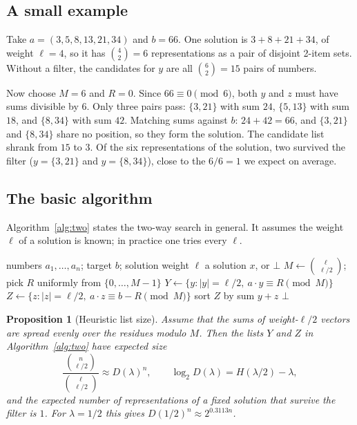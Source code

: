 \documentclass[conference]{IEEEtran}
\newtheorem{proposition}{Proposition}
\begin{document}
\subsection{A small example}
Take $a=(3,5,8,13,21,34)$ and $b=66$. One solution is $3+8+21+34$, of weight
$\ell=4$, so it has $\binom42=6$ representations as a pair of disjoint 2-item
sets. Without a filter, the candidates for $y$ are all $\binom62=15$ pairs of
numbers.

Now choose $M=6$ and $R=0$. Since $66\equiv0\pmod6$, both $y$ and $z$ must have
sums divisible by $6$. Only three pairs pass: $\{3,21\}$ with sum $24$,
$\{5,13\}$ with sum $18$, and $\{8,34\}$ with sum $42$. Matching sums against
$b$: $24+42=66$, and $\{3,21\}$ and $\{8,34\}$ share no position, so they form
the solution. The candidate list shrank from $15$ to $3$. Of the six
representations of the solution, two survived the filter ($y=\{3,21\}$ and
$y=\{8,34\}$), close to the $6/6=1$ we expect on average.

\subsection{The basic algorithm}
Algorithm~\ref{alg:two} states the two-way search in general. It assumes the
weight $\ell$ of a solution is known; in practice one tries every $\ell$.

\begin{algorithm}[t]
\caption{Two-way representation search}
\label{alg:two}
\begin{algorithmic}[1]
\Require numbers $a_1,\dots,a_n$; target $b$; solution weight $\ell$
\Ensure a solution $x$, or $\bot$
\State $M\gets\binom{\ell}{\ell/2}$; pick $R$ uniformly from $\{0,\dots,M-1\}$
\State $Y\gets\{y: |y|=\ell/2,\ a\cdot y\equiv R \pmod M\}$
\State $Z\gets\{z: |z|=\ell/2,\ a\cdot z\equiv b-R \pmod M\}$
\State sort $Z$ by sum
   
      \State \Return $y+z$
    \EndIf
  \EndFor
\EndFor
\State \Return $\bot$ 
\end{algorithmic}
\end{algorithm}

\begin{proposition}[Heuristic list size]\label{prop:two}
Assume that the sums of weight-$\ell/2$ vectors are spread evenly over the
residues modulo $M$. Then the lists $Y$ and $Z$ in Algorithm~\ref{alg:two} have
expected size
\[
\frac{\binom{n}{\ell/2}}{\binom{\ell}{\ell/2}}\approx
D(\lambda)^n,\qquad \log_2D(\lambda)=H(\lambda/2)-\lambda,
\]
and the expected number of representations of a fixed solution that survive the
filter is $1$. For $\lambda=1/2$ this gives $D(1/2)^n\approx2^{0.3113n}$.
\end{proposition}
\end{document}

